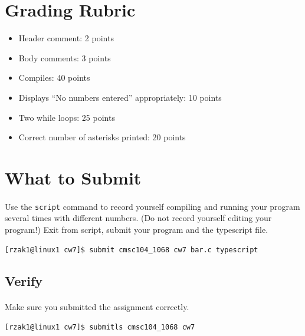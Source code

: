 \documentclass[letter,11pt]{article}
\begin{document}
\section*{Grading Rubric}
\begin{itemize}
    \item Header comment: 2 points
    \item Body comments: 3 points
    \item Compiles: 40 points
    \item Displays ``No numbers entered'' appropriately: 10 points
    \item Two while loops: 25 points
    \item Correct number of asterisks printed: 20 points
\end{itemize}

\section*{What to Submit}
\paragraph{}Use the \texttt{script} command to record yourself compiling and running your program several times with different numbers. (Do not record yourself editing your program!) Exit from script, submit your program and the typescript file.
\begin{verbatim}
[rzak1@linux1 cw7]$ submit cmsc104_1068 cw7 bar.c typescript
\end{verbatim}

\subsection*{Verify}
\paragraph{}Make sure you submitted the assignment correctly.
\begin{verbatim}
[rzak1@linux1 cw7]$ submitls cmsc104_1068 cw7
\end{verbatim}
\end{document}
